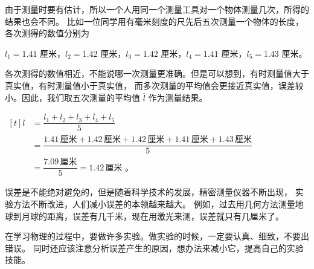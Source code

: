 由于测量时要有估计，所以一个人用同一个测量工具对一个物体测量几次，所得的结果也会不同。
比如一位同学用有毫米刻度的尺先后五次测量一个物体的长度，各次测得的数值分别为

$l_1 = 1.41$ 厘米，$l_2 = 1.42$ 厘米，$l_3 = 1.42$ 厘米，$l_4 = 1.41$ 厘米，$l_5 = 1.43$ 厘米。

各次测得的数值相近，不能说哪一次测量更准确。但是可以想到，有时测量值大于真实值，有时测量值小于真实值，
而多次测量的平均值会更接近真实值，误差较小。因此，我们取五次测量的平均值 $\bar{l}$ 作为测量结果。

$\begin{aligned}[t]
    l &= \dfrac{l_1 + l_2 + l_3 + l_4 + l_5}{5} \\
      &= \dfrac{1.41 \,\text{厘米} + 1.42 \,\text{厘米} + 1.42 \,\text{厘米} + 1.41 \,\text{厘米} + 1.43 \,\text{厘米}}{5} \\
      &= \dfrac{7.09 \,\text{厘米}}{5} = 1.42 \,\text{厘米 。}
\end{aligned}$

误差是不能绝对避免的，但是随着科学技术的发展，精密测量仪器不断出现，
实验方法不断改进，人们减小误差的本领越来越大。
例如，过去用几何方法测量地球到月球的距离，误差有几千米，现在用激光来测，误差就只有几厘米了。

在学习物理的过程中，要做许多实验。做实验的时候，一定要认真、细致，不要出错误。
同时还应该注意分析误差产生的原因，想办法来减小它，提高自己的实验技能。


